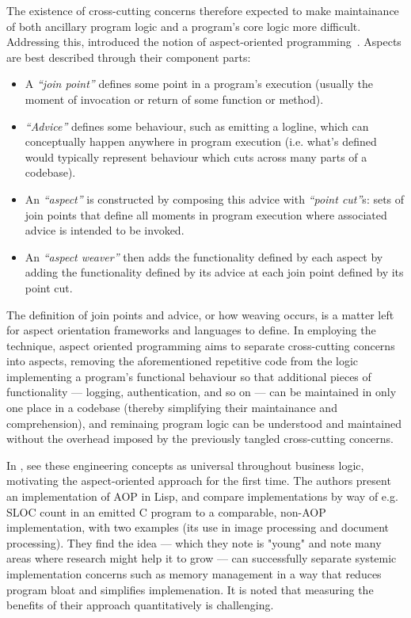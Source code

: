 The existence of cross-cutting concerns therefore expected to make maintainance
of both ancillary program logic and a program's core logic more difficult.
Addressing this, \citeauthor{kiczales1997aspect} introduced the notion of
aspect-oriented programming~\cite{kiczales1997aspect}. Aspects are best
described through their component parts:

\begin{itemize}
    \item A \emph{``join point''} defines some point in a program's execution
(usually the moment of invocation or return of some function or method).
    \item \emph{``Advice''} defines some behaviour, such as emitting a logline, which
    can conceptually happen anywhere in program execution (i.e. what's defined
    would typically represent behaviour which cuts across many parts of a
    codebase).
    \item An \emph{``aspect''} is constructed by composing this advice with
    \emph{``point cut''}s: sets of join points that define all moments in
    program execution where associated advice is intended to be invoked.
    \item An \emph{``aspect weaver''} then adds the functionality defined by
    each aspect by adding the functionality defined by its advice at each join
    point defined by its point cut.
\end{itemize}

The definition of join points and advice, or how weaving occurs, is a matter
left for aspect orientation frameworks and languages to define. In employing the
technique, aspect oriented programming aims to separate cross-cutting concerns
into aspects, removing the aforementioned repetitive code from the logic
implementing a program's functional behaviour so that additional pieces of
functionality --- logging, authentication, and so on --- can be maintained in
only one place in a codebase (thereby simplifying their maintainance and
comprehension), and reminaing program logic can be understood and maintained
without the overhead imposed by the previously tangled cross-cutting concerns.

In \cite{kiczales1997aspect}, \citeauthor{kiczales1997aspect} see these
engineering concepts as universal throughout business logic, motivating the
aspect-oriented approach for the first time. The authors present an
implementation of AOP in Lisp, and compare implementations by way of e.g. SLOC
count in an emitted C program to a comparable, non-AOP implementation, with two
examples (its use in image processing and document processing). They find the
idea --- which they note is "young" and note many areas where research might
help it to grow --- can successfully separate systemic implementation concerns
such as memory management in a way that reduces program bloat and simplifies
implemenation. It is noted that measuring the benefits of their approach
quantitatively is challenging.

